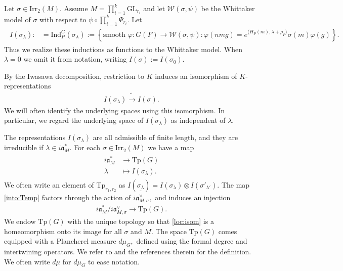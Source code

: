 \documentclass[12pt]{amsart}
\theoremstyle{remark}
\numberwithin{equation}{section}
\newcommand{\GL}{\mathrm{GL}}
\newcommand{\Ind}{\mathrm{Ind}}
\newcommand{\lto}{\longrightarrow}
\theoremstyle{definition}
\numberwithin{equation}{subsection}
\begin{document}
Let $\sigma \in \mathrm{Irr}_2(M).$
Assume $M=\prod_{i=1}^k\GL_{r_i}$
and let $\mathcal{W}(\sigma,\psi)$ be the Whittaker model of $\sigma$ with respect to $\psi \circ \prod_{i=1}^k\Psi_{r_i}.$ 
Let 
\begin{align*} \begin{split}
I(\sigma_\lambda):&=\Ind_P^G(\sigma_\lambda):=\left\{\textrm{smooth }\varphi :G(F) \to \mathcal{W}(\sigma,\psi):\varphi(nmg)=e^{\langle H_P(m),\lambda +\rho_P \rangle}\sigma(m)\varphi(g)\right\}. \end{split}
\end{align*}
Thus we realize these inductions as functions to the Whittaker model.  When $\lambda=0$ we omit it from notation, writing $I(\sigma):=I(\sigma_0).$

   By the Iwasawa decomposition, restriction to $K$ induces an isomorphism of $K$-representations
\begin{align*}
    I(\sigma_\lambda) \tilde{\lto} I(\sigma).
\end{align*}
We will often identify the underlying spaces using this isomorphism.  In particular, we regard the underlying space of $I(\sigma_\lambda)$ as independent of $\lambda.$

The representations $I(\sigma_\lambda)$ are all admissible of finite length, and they are irreducible if $\lambda \in i\mathfrak{a}_M^*.$
For each $\sigma \in \mathrm{Irr}_2(M)$ we have a map
\begin{align} \label{into:Temp} \begin{split}
    i\mathfrak{a}_M^* &\lto \mathrm{Tp}(G)\\
    \lambda &\longmapsto I(\sigma_\lambda). \end{split}
\end{align}
We often write an element of $\mathrm{Tp}_{r_1,r_2}$ as $
I(\underline{\sigma_\lambda})=I(\sigma_\lambda) \otimes I(\sigma'_{\lambda'}).$ The map \eqref{into:Temp} factors through the action of $i\mathfrak{a}_{M,\sigma}^\vee,$ and induces an injection
\begin{align} \label{loc:isom}
    i\mathfrak{a}_M^*/i\mathfrak{a}_{M,\sigma}^\vee \lto \mathrm{Tp}(G).
\end{align}
We endow $\mathrm{Tp}(G)$ with the unique topology so that \eqref{loc:isom} is a homeomorphism onto its image for all $\sigma$ and $M.$  The space $\mathrm{Tp}(G)$ comes equipped with a Plancherel measure $d\mu_G,$ defined using the formal degree and intertwining operators.  We refer to \cite[\S 2.4, \S 2.6]{BP:Ast} and the references therein for the definition.  We often write $d\mu$ for $d\mu_G$ to ease notation.
\end{document}
